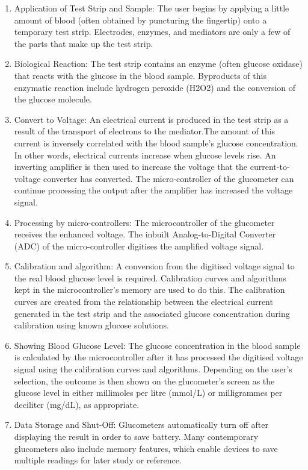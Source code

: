\documentclass[conference,compsoc]{IEEEtran}
\begin{document}
\begin{enumerate}
    
    \item Application of Test Strip and Sample:
The user begins by applying a little amount of blood (often obtained by puncturing the fingertip) onto a temporary test strip. Electrodes, enzymes, and mediators are only a few of the parts that make up the test strip.
    \item Biological Reaction:
The test strip contains an enzyme (often glucose oxidase) that reacts with the glucose in the blood sample. Byproducts of this enzymatic reaction include hydrogen peroxide (H2O2) and the conversion of the glucose molecule.

\item Convert to Voltage:
An electrical current is produced in the test strip as a result of the transport of electrons to the mediator.The amount of this current is inversely correlated with the blood sample's glucose concentration. In other words, electrical currents increase when glucose levels rise. An inverting amplifier is then used to increase the voltage that the current-to-voltage converter has converted. The micro-controller of the glucometer can continue processing the output after the amplifier has increased the voltage signal.

\item Processing by micro-controllers: The microcontroller of the glucometer receives the enhanced voltage. The inbuilt Analog-to-Digital Converter (ADC) of the micro-controller digitises the amplified voltage signal.

\item Calibration and algorithm: A conversion from the digitised voltage signal to the real blood glucose level is required. Calibration curves and algorithms kept in the microcontroller's memory are used to do this. The calibration curves are created from the relationship between the electrical current generated in the test strip and the associated glucose concentration during calibration using known glucose solutions.

\item Showing Blood Glucose Level: The glucose concentration in the blood sample is calculated by the microcontroller after it has processed the digitised voltage signal using the calibration curves and algorithms. Depending on the user's selection, the outcome is then shown on the glucometer's screen as the glucose level in either millimoles per litre (mmol/L) or milligrammes per deciliter (mg/dL), as appropriate.

\item Data Storage and Shut-Off: Glucometers automatically turn off after displaying the result in order to save battery. Many contemporary glucometers also include memory features, which enable devices to save multiple readings for later study or reference.
\end{enumerate}
\end{document}
